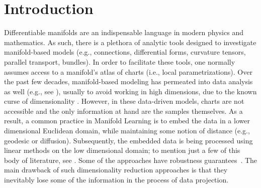 \documentclass[12pt]{article}
\theoremstyle{remark}
\begin{document}
\section{Introduction}
Differentiable manifolds are an indispensable language in modern physics and mathematics. 
As such, there is a plethora of analytic tools designed to investigate manifold-based models (e.g., connections, differential forms, curvature tensors, parallel transport, bundles). 
In order to facilitate these tools, one normally assumes access to a manifold's atlas of charts (i.e., local parametrizations). 
Over the past few decades, manifold-based modeling has permeated into data analysis as well (e.g., see  \cite{hastie1984principal,roweis2000LLE, scholkopf1998KPCA}), usually to avoid working in high dimensions, due to the known curse of dimensionality \cite{stone1980optimal}. 
However, in these data-driven models, charts are not accessible and the only information at hand are the samples themselves. 
As a result, a common practice in Manifold Learning is to embed the data in a lower dimensional Euclidean domain, while maintaining some notion of distance (e.g., geodesic or diffusion).
Subsequently, the embedded data is being processed using linear methods on the low dimensional domain; to mention just a few of this body of literature, see  \cite{belkin2003laplacian,belkin2006manifold,coifman2006diffusion,saul2003LLE}. Some of the approaches have robustness guarantees~\cite{ding2020phase,dunson2021spectral,el2016graph,shen2020scalability}.
The main drawback of such dimensionality reduction approaches is that they inevitably lose some of the information in the process of data projection.
\end{document}
